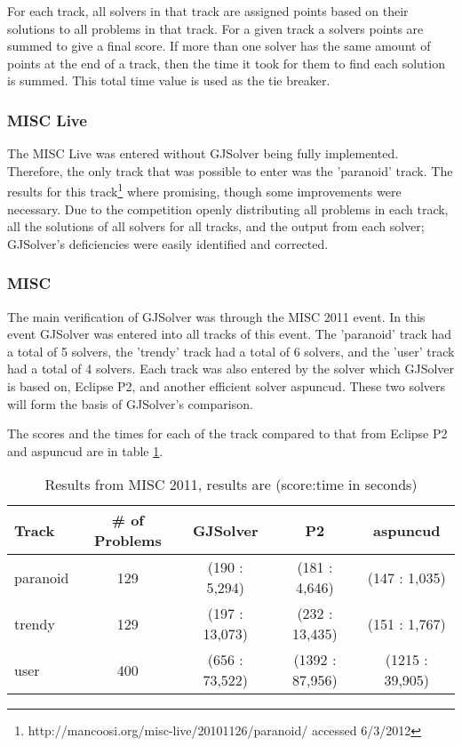 For each track, all solvers in that track are assigned points based on their solutions to all problems in that track.
For a given track a solvers points are summed to give a final score.
If more than one solver has the same amount of points at the end of a track, then the time it took for them to find each solution is summed.
This total time value is used as the tie breaker.

\subsubsection{MISC Live}
The MISC Live was entered without GJSolver being fully implemented.
Therefore, the only track that was possible to enter was the 'paranoid' track.
The results for this track\footnote{http://mancoosi.org/misc-live/20101126/paranoid/ accessed 6/3/2012} where promising, though some improvements were necessary.
Due to the competition openly distributing all problems in each track, all the solutions of all solvers for all tracks, 
and the output from each solver;
GJSolver's deficiencies were easily identified and corrected.

\subsubsection{MISC}
The main verification of GJSolver was through the MISC 2011 event.
In this event GJSolver was entered into all tracks of this event.
The 'paranoid' track had a total of 5 solvers, the 'trendy' track had a total of 6 solvers, 
and the 'user' track had a total of 4 solvers.
Each track was also entered by the solver which GJSolver is based on, Eclipse P2, and another efficient solver aspuncud.
These two solvers will form the basis of GJSolver's comparison.

The scores and the times for each of the track compared to that from Eclipse P2 and aspuncud are in table \ref{impl.misc2011}.
\begin{table}
\begin{tabular}{| l | c | c | c | c |}\hline
Track & \# of Problems & GJSolver & P2 & aspuncud\\ \hline
paranoid & 129 & (190 : 5,294) & (181 : 4,646) & (147 : 1,035) \\ \hline
trendy & 129 & (197 : 13,073) & (232 : 13,435) & (151 : 1,767) \\ \hline
user & 400 & (656 : 73,522) & (1392 : 87,956) & (1215 : 39,905) \\ \hline
\end{tabular}
\caption{Results from MISC 2011, results are (score:time in seconds)}
\label{impl.misc2011}
\end{table}

